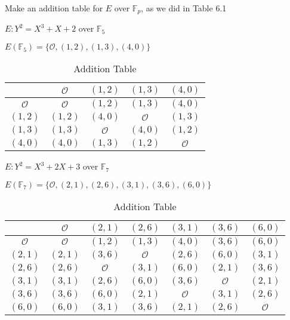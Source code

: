 \documentclass[12pt]{article}
\begin{document}
\newpage
\problem Make an addition table for $E$ over $\mathbb{F}_p$, as we did in Table 6.1

\subproblem $E:Y^2=X^3+X+2$ over $\mathbb{F}_5$

\solution $E(\mathbb{F}_5)=\{\mathcal{O},(1,2),(1,3),(4,0)\}$
\begin{table}[!ht]
    \centering
    \begin{tabular}{|c||c|c|c|c|}
        \hline
                      & $\mathcal{O}$ & $(1,2)$       & $(1,3)$       & $(4,0)$       \\ \hline\hline
        $\mathcal{O}$ & $\mathcal{O}$ & $(1,2)$       & $(1,3)$       & $(4,0)$       \\ \hline
        $(1,2)$       & $(1,2)$       & $(4,0)$       & $\mathcal{O}$ & $(1,3)$       \\ \hline
        $(1,3)$       & $(1,3)$       & $\mathcal{O}$ & $(4,0)$       & $(1,2)$       \\ \hline
        $(4,0)$       & $(4,0)$       & $(1,3)$       & $(1,2)$       & $\mathcal{O}$ \\\hline
    \end{tabular}
    \caption{Addition Table}
\end{table}

\subproblem $E:Y^2=X^3+2X+3$ over $\mathbb{F}_7$

\solution $E(\mathbb{F}_7)=\{\mathcal{O},(2,1),(2,6),(3,1),(3,6),(6,0)\}$
\begin{table}[!ht]
    \centering
    \begin{tabular}{|c||c|c|c|c|c|c|}
        \hline
                      & $\mathcal{O}$ & $(2,1)$       & $(2,6)$       & $(3,1)$       & $(3,6)$       & $(6,0)$       \\ \hline\hline
        $\mathcal{O}$ & $\mathcal{O}$ & $(1,2)$       & $(1,3)$       & $(4,0)$       & $(3,6)$       & $(6,0)$       \\ \hline
        $(2,1)$       & $(2,1)$       & $(3,6)$       & $\mathcal{O}$ & $(2,6)$       & $(6,0)$       & $(3,1)$       \\ \hline
        $(2,6)$       & $(2,6)$       & $\mathcal{O}$ & $(3,1)$       & $(6,0)$       & $(2,1)$       & $(3,6)$       \\ \hline
        $(3,1)$       & $(3,1)$       & $(2,6)$       & $(6,0)$       & $(3,6)$       & $\mathcal{O}$ & $(2,1)$       \\ \hline
        $(3,6)$       & $(3,6)$       & $(6,0)$       & $(2,1)$       & $\mathcal{O}$ & $(3,1)$       & $(2,6)$       \\ \hline
        $(6,0)$       & $(6,0)$       & $(3,1)$       & $(3,6)$       & $(2,1)$       & $(2,6)$       & $\mathcal{O}$ \\ \hline
    \end{tabular}
    \caption{Addition Table}
\end{table}
\end{document}
